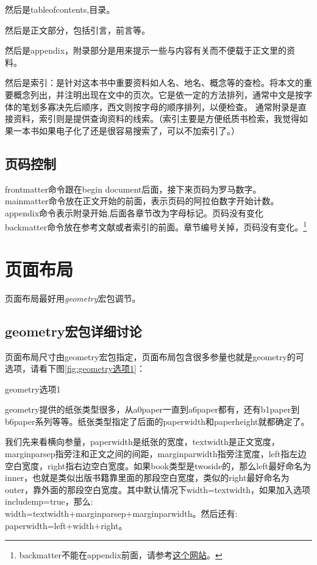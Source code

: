 \documentclass[11pt,oneside]{book}
\begin{document}
然后是tableofcontents,目录。

然后是正文部分，包括引言，前言等。

然后是appendix，附录部分是用来提示一些与内容有关而不便载于正文里的资料。

然后是索引：是针对这本书中重要资料如人名、地名、概念等的查检。将本文的重要概念列出，并注明出现在文中的页次。它是依一定的方法排列，通常中文是按字体的笔划多寡决先后顺序，西文则按字母的顺序排列，以便检查。 通常附录是直接资料，索引则是提供查询资料的线索。（索引主要是方便纸质书检索，我觉得如果一本书如果电子化了还是很容易搜索了，可以不加索引了。）


\section{页码控制}
\label{sec:页码}
frontmatter命令跟在begin document后面，接下来页码为罗马数字。\\
mainmatter命令放在正文开始的前面，表示页码的阿拉伯数字开始计数。\\ 
appendix命令表示附录开始,后面各章节改为字母标记。页码没有变化\\
backmatter命令放在参考文献或者索引的前面。章节编号关掉，页码没有变化。\footnote{backmatter不能在appendix前面，请参考\href{http://tex.stackexchange.com/questions/20538/what-is-the-right-order-when-using-frontmatter-tableofcontents-mainmatter}{这个网站}。}



\chapter{页面布局}
页面布局最好用\emph{geometry}宏包调节。

\section{geometry宏包详细讨论}
页面布局尺寸由geometry宏包指定，页面布局包含很多参量也就是geometry的可选项，请看下图\ref{fig:geometry选项1}：

\begin{linefig}{geometry选项1}   %
\caption{geometry选项1}
\label{fig:geometry选项1}
\end{linefig}

geometry提供的纸张类型很多，从a0paper一直到a6paper都有，还有b1paper到b6paper系列等等。纸张类型指定了后面的paperwidth和paperheight就都确定了。

我们先来看横向参量，paperwidth是纸张的宽度，textwidth是正文宽度，marginparsep指旁注和正文之间的间距，marginparwidth指旁注宽度，left指左边空白宽度，right指右边空白宽度。如果book类型是twoside的，那么left最好命名为inner，也就是类似出版书籍靠里面的那段空白宽度，类似的right最好命名为outer，靠外面的那段空白宽度。其中默认情况下width=textwidth，如果加入选项\\includemp=true，那么:\\width=textwidth+marginparsep+marginparwidth。然后还有:\\paperwidth=left+width+right。
\end{document}
